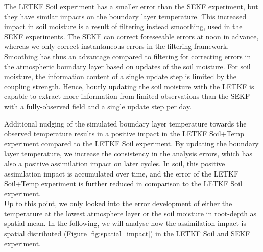 \documentclass[HESSD, manuscript]{copernicus}
\begin{document}
The LETKF Soil experiment has a smaller error than the SEKF experiment, but they have similar impacts on the boundary layer temperature.
This increased impact in soil moisture is a result of filtering instead smoothing, used in the SEKF experiments.
The SEKF can correct foreseeable errors at noon in advance, whereas we only correct instantaneous errors in the filtering framework.
Smoothing has thus an advantage compared to filtering for correcting errors in the atmospheric boundary layer based on updates of the soil moisture.
For soil moisture, the information content of a single update step is limited by the coupling strength.
Hence, hourly updating the soil moisture with the LETKF is capable to extract more information from limited observations than the SEKF with a fully-observed field and a single update step per day.

Additional nudging of the simulated boundary layer temperature towards the observed temperature results in a positive impact in the LETKF Soil+Temp experiment compared to the LETKF Soil experiment.
By updating the boundary layer temperature, we increase the consistency in the analysis errors, which has also a positive assimilation impact on later cycles.
In soil, this positive assimilation impact is accumulated over time, and the error of the LETKF Soil+Temp experiment is further reduced in comparison to the LETKF Soil experiment.\\

Up to this point, we only looked into the error development of either the temperature at the lowest atmosphere layer or the soil moisture in root-depth as spatial mean.
In the following, we will analyse how the assimilation impact is spatial distributed (Figure \ref{fig:spatial_impact}) in the LETKF Soil and SEKF experiment.
\end{document}
